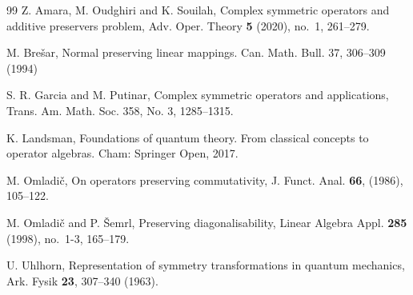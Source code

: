 \documentclass[11pt]{amsart}
\theoremstyle{remark}
\begin{document}
\begin{thebibliography}{99}
 Z. Amara, M. Oudghiri and K. Souilah, Complex symmetric operators and additive preservers problem, Adv. Oper. Theory {\bf 5} (2020), no.~1, 261--279.

 M. Bre\v{s}ar, Normal preserving linear mappings. Can. Math. Bull. 37, 306–309 (1994)



 S. R. Garcia and M. Putinar,  Complex symmetric operators and applications, Trans. Am. Math. Soc. 358, No. 3, 1285--1315.

 K. Landsman,  Foundations of quantum theory. From classical concepts to operator algebras. Cham: Springer Open, 2017.

 M. Omladi\v c{}, On operators preserving commutativity, J. Funct. Anal. {\bf 66}, (1986), 105--122.

 M. Omladi\v c{} and P. \v Semrl, Preserving diagonalisability, Linear Algebra Appl. {\bf 285} (1998), no.~1-3, 165--179.

 U. Uhlhorn, Representation of symmetry transformations in quantum mechanics, Ark. Fysik
{\bf 23}, 307–340 (1963).

\end{thebibliography}
\end{document}
